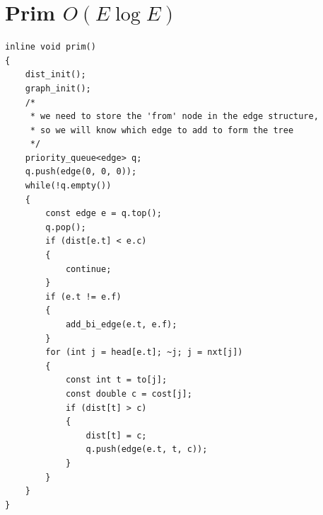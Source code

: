 \documentclass[12pt]{book}
\begin{document}
\section{Prim $O(E\log E)$}
\begin{verbatim}
inline void prim()
{
	dist_init();
	graph_init();
	/*
	 * we need to store the 'from' node in the edge structure,
	 * so we will know which edge to add to form the tree
	 */
	priority_queue<edge> q;
	q.push(edge(0, 0, 0));
	while(!q.empty())
	{
		const edge e = q.top();
		q.pop();
		if (dist[e.t] < e.c)
		{
			continue;
		}
		if (e.t != e.f)
		{
			add_bi_edge(e.t, e.f);
		}
		for (int j = head[e.t]; ~j; j = nxt[j])
		{
			const int t = to[j];
			const double c = cost[j];
			if (dist[t] > c)
			{
				dist[t] = c;
				q.push(edge(e.t, t, c));
			}
		}
	}
}
\end{verbatim}
\end{document}
